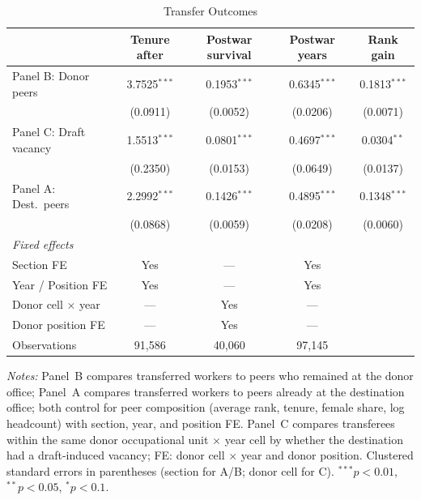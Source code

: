 \begin{table}[htbp]
\centering
\caption{Transfer Outcomes}
\label{tab:transfer-outcomes-combined}
\begin{threeparttable}
\begin{tabular}{lcccc}
\toprule
 & Tenure after & Postwar survival & Postwar years & Rank gain \\
\midrule
Panel B: Donor peers & 3.7525$^{***}$ & 0.1953$^{***}$ & 0.6345$^{***}$ & 0.1813$^{***}$ \\
                        & (0.0911) & (0.0052) & (0.0206) & (0.0071) \\[4pt]
Panel C: Draft vacancy & 1.5513$^{***}$ & 0.0801$^{***}$ & 0.4697$^{***}$ & 0.0304$^{**}$ \\
                        & (0.2350) & (0.0153) & (0.0649) & (0.0137) \\[4pt]
Panel A: Dest.\ peers & 2.2992$^{***}$ & 0.1426$^{***}$ & 0.4895$^{***}$ & 0.1348$^{***}$ \\
                        & (0.0868) & (0.0059) & (0.0208) & (0.0060) \\[4pt]
\midrule
\textit{Fixed effects} & & & & \\
Section FE              & Yes & --- & Yes \\
Year / Position FE      & Yes & --- & Yes \\
Donor cell $\times$ year & --- & Yes & --- \\
Donor position FE       & --- & Yes & --- \\
Observations            & 91,586 & 40,060 & 97,145 \\
\bottomrule
\end{tabular}
\begin{tablenotes}[flushleft]
\footnotesize
\item \textit{Notes:} Panel~B compares transferred workers to peers who remained at the donor office; Panel~A compares transferred workers to peers already at the destination office; both control for peer composition (average rank, tenure, female share, log headcount) with section, year, and position FE. Panel~C compares transferees within the same donor occupational unit $\times$ year cell by whether the destination had a draft-induced vacancy; FE: donor cell $\times$ year and donor position. Clustered standard errors in parentheses (section for A/B; donor cell for C). $^{***}p<0.01$, $^{**}p<0.05$, $^{*}p<0.1$.
\end{tablenotes}
\end{threeparttable}
\end{table}
